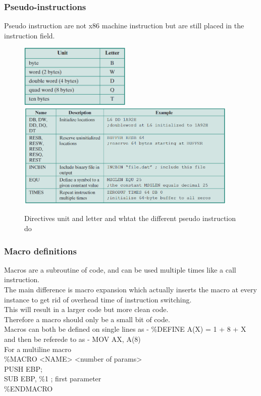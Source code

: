 \documentclass[12pt, a4paper]{article}
\begin{document}
			\subsubsection{Pseudo-instructions}
				Pseudo instruction are not x86 machine instruction but are still placed in the instruction field.\\
				\begin{figure}
					\includegraphics[width=200px]{assets/assemblyDirectives.png}\\
					\includegraphics[width=400px]{assets/x86Directives.png}
					\caption{Directives unit and letter and whtat the different pseudo instruction do}
					\centering
				\end{figure}
			\subsubsection{Macro definitions}
				Macros are a subroutine of code, and can be used multiple times like a call instruction.\\
				The main difference is macro expansion which actually inserts the macro at every instance to get rid of overhead time of instruction switching.\\
				This will result in a larger code but more clean code. \\
				Therefore a macro should only be a small bit of code.\\
				Macros can both be defined on single lines as - \%DEFINE A(X) = 1 + 8 + X and then be referede to as - MOV AX, A(8)\\
				For a multiline macro \\
				\%MACRO <NAME> <number of params>\\
					PUSH EBP;\\
					SUB EBP, \%1 ; first parameter\\
				\%ENDMACRO\\
\end{document}
